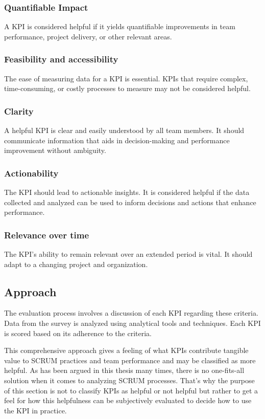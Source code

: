\subsubsection{Quantifiable Impact}

A KPI is considered helpful if it yields quantifiable improvements 
in team performance, project delivery, or other relevant areas.

\subsubsection{Feasibility and accessibility}
The ease of measuring data for a KPI is essential. 
KPIs that require complex, time-consuming, or costly processes 
to measure may not be considered helpful.

\subsubsection{Clarity}

A helpful KPI is clear and easily understood 
by all team members. 
It should communicate information that aids in 
decision-making and performance improvement without ambiguity.

\subsubsection{Actionability}
The KPI should lead to actionable insights. 
It is considered helpful if the data collected and 
analyzed can be used to inform decisions and actions 
that enhance performance.

\subsubsection{Relevance over time}
The KPI's ability to remain relevant over an extended period is vital. 
It should adapt to a changing project and organization.

\subsection{Approach}\label{approach-kpi-explore}

The evaluation process involves a discussion of each 
KPI regarding these criteria. 
Data from the survey is analyzed using analytical tools and techniques. 
Each KPI is scored based on its adherence to the criteria.

This comprehensive approach gives a feeling of what 
KPIs contribute tangible value to SCRUM practices and 
team performance and may be classified as more helpful. 
As has been argued in this thesis many times, 
there is no one-fits-all solution when it comes to analyzing SCRUM processes. 
That's why the purpose of this section is not to classify 
KPIs as helpful or not helpful but rather to get a feel for how this 
helpfulness can be subjectively evaluated to 
decide how to use the KPI in practice. 

